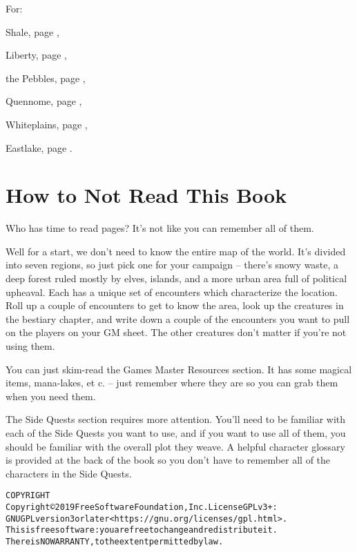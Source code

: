 \begin{multicols}{2}
For:

Shale, page \pageref{tom:autumn},

Liberty, page \pageref{tom:swamp},

the Pebbles, page \pageref{tom:pebbles},

Quennome, page \pageref{tom:quen},

Whiteplains, page \pageref{tom:whiteplains},

Eastlake, page \pageref{tom:winter}.

\end{multicols}

\section*{How to Not Read This Book}

\begin{multicols}{2}

\noindent Who has time to read \pageref{lastpage} pages?  It's not like you can remember all of them.

Well for a start, we don't need to know the entire map of the world.
It's divided into seven regions, so just pick one for your campaign -- there's snowy waste, a deep forest ruled mostly by elves, islands, and a more urban area full of political upheaval.
Each has a unique set of encounters which characterize the location.
Roll up a couple of encounters to get to know the area, look up the creatures in the bestiary chapter, and write down a couple of the encounters you want to pull on the players on your GM sheet.
The other creatures don't matter if you're not using them.

You can just skim-read the Games Master Resources section.
It has some magical items, mana-lakes, et c. -- just remember where they are so you can grab them when you need them.

The Side Quests section requires more attention.
You'll need to be familiar with each of the Side Quests you want to use, and if you want to use all of them, you should be familiar with the overall plot they weave.
A helpful character glossary is provided at the back of the book so you don't have to remember all of the characters in the Side Quests.

\end{multicols}

\begin{alltt}
COPYRIGHT
       Copyright \copyright 2019 Free Software Foundation, Inc.  License GPLv3+:
	GNU GPL version 3 or later <https://gnu.org/licenses/gpl.html>.
       This is free software: you are free to change and redistribute it.
	There is NO WARRANTY, to the extent permitted by law.

\end{alltt}

